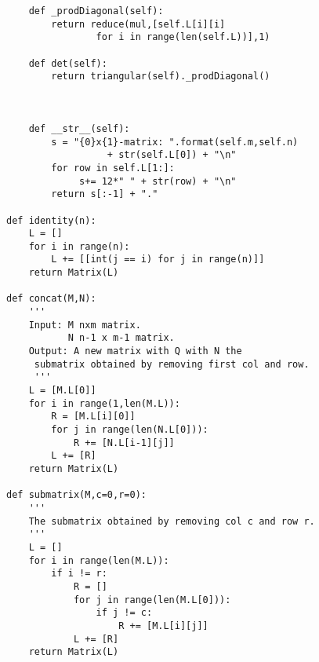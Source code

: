 \documentclass[11pt, english]{article}
\begin{document}
\begin{lstlisting}
	def _prodDiagonal(self):
		return reduce(mul,[self.L[i][i]
			    for i in range(len(self.L))],1)

	def det(self):
		return triangular(self)._prodDiagonal()



	def __str__(self):
		s = "{0}x{1}-matrix: ".format(self.m,self.n)
		          + str(self.L[0]) + "\n"
		for row in self.L[1:]:
			 s+= 12*" " + str(row) + "\n"
		return s[:-1] + "."

def identity(n):
	L = []
	for i in range(n):
		L += [[int(j == i) for j in range(n)]]
	return Matrix(L)

def concat(M,N):
	'''
	Input: M nxm matrix.
	       N n-1 x m-1 matrix.
	Output: A new matrix with Q with N the
	 submatrix obtained by removing first col and row.
	 '''
	L = [M.L[0]]
	for i in range(1,len(M.L)):
		R = [M.L[i][0]]
		for j in range(len(N.L[0])):
			R += [N.L[i-1][j]]
		L += [R]
	return Matrix(L)

def submatrix(M,c=0,r=0):
	'''
	The submatrix obtained by removing col c and row r.
	'''
	L = []
	for i in range(len(M.L)):
		if i != r:
			R = []
			for j in range(len(M.L[0])):
				if j != c:
					R += [M.L[i][j]]
			L += [R]
	return Matrix(L)
\end{lstlisting}
\end{document}

